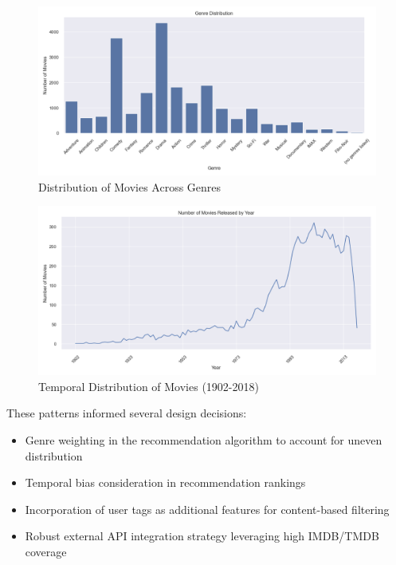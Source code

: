 \documentclass[12pt]{article}
\begin{document}
\begin{figure}[h]
    \centering
    \includegraphics[width=\textwidth]{genre_distribution.png}
    \caption{Distribution of Movies Across Genres}
    \label{fig:genre_distribution}
\end{figure}

\begin{figure}[h]
    \centering
    \includegraphics[width=\textwidth]{movie_releases_by_year.png}
    \caption{Temporal Distribution of Movies (1902-2018)}
    \label{fig:temporal_distribution}
\end{figure}

These patterns informed several design decisions:
\begin{itemize}
    \item Genre weighting in the recommendation algorithm to account for uneven distribution
    \item Temporal bias consideration in recommendation rankings
    \item Incorporation of user tags as additional features for content-based filtering
    \item Robust external API integration strategy leveraging high IMDB/TMDB coverage
\end{itemize}
\end{document}
